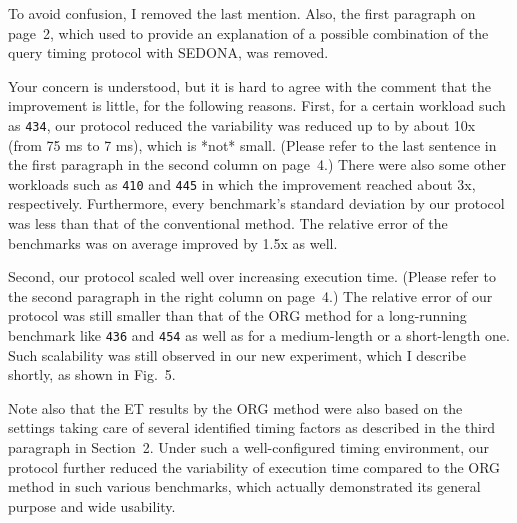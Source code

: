 \documentclass[10pt,letterpaper]{article}
\newenvironment{myindentpar}[1]%
{\begin{list}{}
         {\vspace{10pt}
					\setlength{\leftmargin}{#1}}
          \item[]
}
{\end{list}}
\newcommand{\rev}[1]{\begin{myindentpar}{.25in} {\em {\color{blue}{#1}}}\end{myindentpar}}
\begin{document}
To avoid confusion, I removed the last mention. Also, the first paragraph on page~2, 
which used to provide an explanation of a possible combination of the query timing protocol 
with SEDONA, was removed.


\rev{
(2) If the proposed approach is for a generic purpose, there is a strong
doubt about usability. The improvement of the SEDONA is little. And the
extent of the each benchmark’s improvement described in Table 3
varies widely. Thus, the experimental results does not confirm whether
the SEDONA is widely practical or is useful. The description to clarify
the SEDONA’s characteristics is needed.
} 

Your concern is understood, but it is hard to agree with the comment that the improvement is little, for the following reasons.
First, for a certain workload such as {\tt 434}, 
our protocol reduced the variability was reduced up to by about 10x (from 75 ms to 7 ms), 
which is *not* small. (Please refer to the last sentence 
in the first paragraph in the second column on page~4.)
There were also some other workloads such as {\tt 410} and {\tt 445} 
in which the improvement reached about 3x, respectively. 
Furthermore, every benchmark's standard deviation by our protocol 
was less than that of the conventional method. 
The relative error of the benchmarks was on average improved 
by 1.5x as well.

Second, our protocol scaled well over increasing execution time. 
(Please refer to the second paragraph in the right column on page~4.)
The relative error of our protocol was still smaller than that of the ORG method 
for a long-running benchmark like {\tt 436} and {\tt 454} 
as well as for a medium-length or a short-length one. 
Such scalability was still observed in our new experiment, 
which I describe shortly, as shown in Fig.~5.

Note also that the ET results by the ORG method were also based 
on the settings taking care of several identified timing factors as
described in the third paragraph in Section~2.
Under such a well-configured timing environment, our protocol further 
reduced the variability of execution time compared to the ORG method
in such various benchmarks, 
which actually demonstrated its general purpose and wide usability. 
\end{document}
